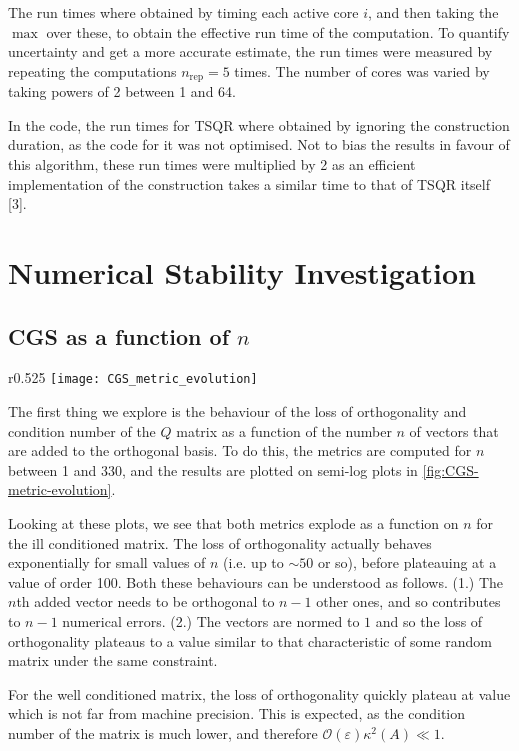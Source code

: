 \documentclass[a4paper, 12pt,oneside]{article}
\begin{document}
			The run times where obtained by timing each active core $i$, and then taking the $\max{}$ over these, to obtain the effective run time of the computation. To quantify uncertainty and get a more accurate estimate, the run times were measured by repeating the computations $n_{\text{rep}}=5$ times.
			The number of cores was varied by taking powers of 2 between 1 and 64.

			In the code, the run times for TSQR where obtained by ignoring the construction duration, as the code for it was not optimised. Not to bias the results in favour of this algorithm, these run times were multiplied by 2 as an efficient implementation of the construction takes a similar time to that of TSQR itself [3].  	
	\section{Numerical Stability Investigation}
		\subsection{CGS as a function of $n$}
		\begin{wrapfigure}[32]{r}{0.525\textwidth}
			\vspace{-1em}
			\centering
			\texttt{[image: CGS\_metric\_evolution]}
			\caption{Evolution of orthogonality metrics for CGS as a function of $n$.}
			\label{fig:CGS-metric-evolution}
		\end{wrapfigure}
		The first thing we explore is the behaviour of the loss of orthogonality and condition number of the $Q$ matrix as a function of the number $n$ of vectors that are added to the orthogonal basis. To do this, the metrics are computed for $n$ between 1 and 330, and the results are plotted on semi-log plots in \ref{fig:CGS-metric-evolution}.

		Looking at these plots, we see that both metrics explode as a function on $n$ for the ill conditioned matrix. The loss of orthogonality actually behaves exponentially for small values of $n$ (i.e. up to $\sim 50$ or so), before plateauing at a value of order 100. Both these behaviours can be understood as follows. (1.) The $n$th added vector needs to be orthogonal to $n-1$ other ones, and so contributes to $n-1$ numerical errors. (2.) The vectors are normed to $1$ and so the loss of orthogonality plateaus to a value similar to that characteristic of some random matrix under the same constraint. 

		For the well conditioned matrix, the loss of orthogonality quickly plateau at value which is not far from machine precision. This is expected, as the condition number of the matrix is much lower, and therefore $\mathcal{O}(\varepsilon)\kappa^2(A)\ll 1$.
\end{document}
